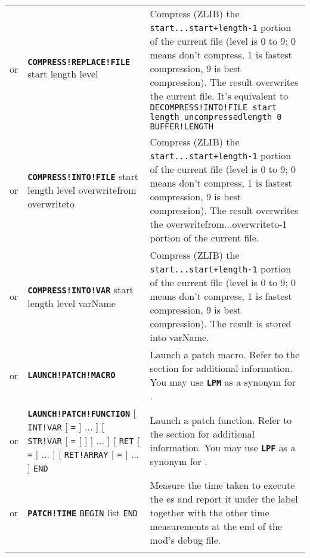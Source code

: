 \documentclass{article}
\def\ttref#1{\ahrefloc{#1}{\tt #1}}
\def\DEFINE#1{{\tt \bf #1}\label{#1}\index{#1}}
\def\t#1{{\tt #1}}
\def\Slist{{\color{red} list }}
\def\Ob{{\color{red} [ }}
\def\Oe{{\color{red} ] }}
\begin{document}
\begin{tabular}{cp{10in}|p{10in}}
or & \DEFINE{COMPRESS!REPLACE!FILE} start length level &
	Compress (ZLIB) the \verb/start...start+length-1/ portion of the current
	file (level is 0 to 9; 0 means don't compress, 1 is fastest compression, 9 is best
	compression). The result overwrites
	the current file. It's equivalent to
	\verb+DECOMPRESS!INTO!FILE start length uncompressedlength 0 BUFFER!LENGTH+
\\
or & \DEFINE{COMPRESS!INTO!FILE} start length level overwritefrom
  overwriteto &
	Compress (ZLIB) the \verb/start...start+length-1/ portion of the current
	file (level is 0 to 9; 0 means don't compress, 1 is fastest compression, 9 is best
	compression). The result overwrites
	the overwritefrom...overwriteto-1 portion of the current file.
\\
or & \DEFINE{COMPRESS!INTO!VAR} start length level varName &
	Compress (ZLIB) the \verb/start...start+length-1/ portion of the current
	file (level is 0 to 9; 0 means don't compress, 1 is fastest compression, 9 is best
	compression). The result is stored into varName.
\\
or & \DEFINE{LAUNCH!PATCH!MACRO} \ttref{String} &
        Launch a patch macro. Refer to the \ttref{macros} section for
        additional information. You may use \DEFINE{LPM} as a synonym
        for \ttref {LAUNCH!PATCH!MACRO}.
\\
or & \DEFINE{LAUNCH!PATCH!FUNCTION} \ttref{String}
     \Ob \t{INT!VAR} \ttref{variable} \Ob \t{=} \ttref{value} \Oe ... \Oe
     \Ob \t{STR!VAR} \ttref{variable} \Ob \t{=} \Ob \ttref{EVALUATE!BUFFER}
     \Oe \ttref{String} \Oe ... \Oe
     \Ob \t{RET} \ttref{variable} \Ob \t{=} \ttref{String} \Oe ... \Oe
     \Ob \t{RET!ARRAY} \ttref{variable} \Ob \t{=} \ttref{String} \Oe ... \Oe
     \t{END} &
        Launch a patch function. Refer to the \ttref{Functions} section for
        additional information. You may use \DEFINE{LPF} as a synonym
        for \ttref{LAUNCH!PATCH!FUNCTION}.
\\
or & \DEFINE{PATCH!TIME} \ttref{String} \t{BEGIN} \ttref{patch}
     \Slist \t{END} &
  Measure the time taken to execute the \ttref{patch}es and report
  it under the label \ttref{String} together with the other time
  measurements at the end of the mod's debug file.
\\
\\


\end{tabular}
\end{document}
